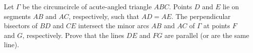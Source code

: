 Let $\Gamma$ be the circumcircle of acute-angled triangle $ABC$. Points $D$ and $E$ lie on segments $AB$ and $AC$, respectively, such that $AD=AE$. The perpendicular bisectors of $BD$ and $CE$ intersect the minor arcs $AB$ and $AC$ of $\Gamma$ at points $F$ and $G$, respectively. Prove that the lines $DE$ and $FG$ are parallel (or are the same line).
